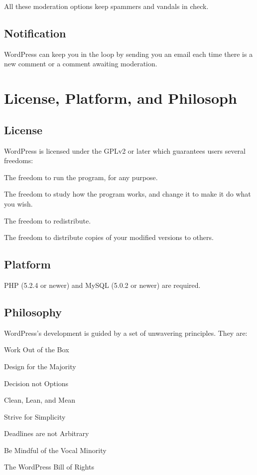 All these moderation options keep spammers and vandals in check.

\subsection{Notification}

WordPress can keep you in the loop by sending you an email each time there is a new comment or a comment awaiting moderation.

\section{License, Platform, and Philosoph}


\subsection{License}

WordPress is licensed under the GPLv2 or later which guarantees users several freedoms:
\begin{compactitem}
\item The freedom to run the program, for any purpose.
\item The freedom to study how the program works, and change it to make it do what you wish.
\item The freedom to redistribute.
\item The freedom to distribute copies of your modified versions to others.
\end{compactitem}

\subsection{Platform}

PHP (5.2.4 or newer) and MySQL (5.0.2 or newer) are required. 

\subsection{Philosophy}

WordPress's development is guided by a set of unwavering principles. They are:
\begin{compactitem}
\item Work Out of the Box
\item Design for the Majority
\item Decision not Options
\item Clean, Lean, and Mean
\item Strive for Simplicity
\item Deadlines are not Arbitrary
\item Be Mindful of the Vocal Minority
\item The WordPress Bill of Rights
\end{compactitem}


